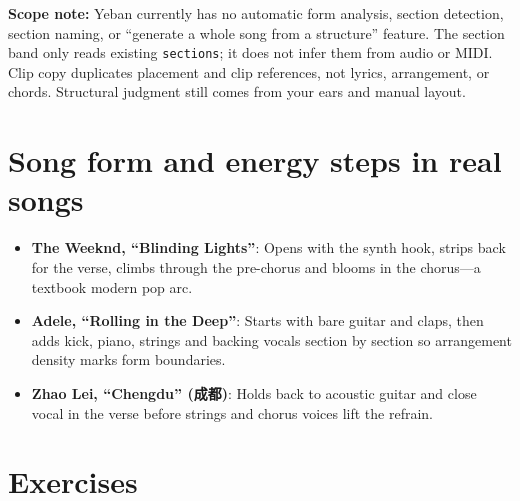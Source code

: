 
\textbf{Scope note:} Yeban currently has no automatic form analysis, section detection, section naming, or ``generate a whole song from a structure'' feature. The section band only reads existing \texttt{sections}; it does not infer them from audio or MIDI. Clip copy duplicates placement and clip references, not lyrics, arrangement, or chords. Structural judgment still comes from your ears and manual layout.

\section{Song form and energy steps in real songs}

\begin{itemize}
  \item \textbf{The Weeknd, ``Blinding Lights''}: Opens with the synth hook, strips back for the verse, climbs through the pre-chorus and blooms in the chorus—a textbook modern pop arc.
  \item \textbf{Adele, ``Rolling in the Deep''}: Starts with bare guitar and claps, then adds kick, piano, strings and backing vocals section by section so arrangement density marks form boundaries.
  \item \textbf{Zhao Lei, ``Chengdu'' (成都)}: Holds back to acoustic guitar and close vocal in the verse before strings and chorus voices lift the refrain.
\end{itemize}

\section{Exercises}


